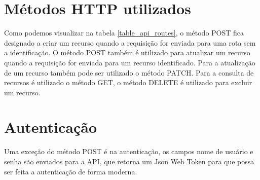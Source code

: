 \section{Métodos HTTP utilizados}

Como podemos visualizar na tabela \ref{table_api_routes}, o método POST fica designado a criar um recurso quando a requisição for enviada para uma rota sem a identificação. O método POST também é utilizado para atualizar um recurso quando a requisição for enviada para um recurso identificado. Para a atualização de um recurso também pode ser utilizado o método PATCH.
Para a consulta de recursos é utilizado o método GET, o método DELETE é utilizado para excluir um recurso.

\section{Autenticação}

Uma exceção do método POST é na autenticação, os campos nome de usuário e senha são enviados para a API, que retorna um Json Web Token para que possa ser feita a autenticação de forma moderna.
